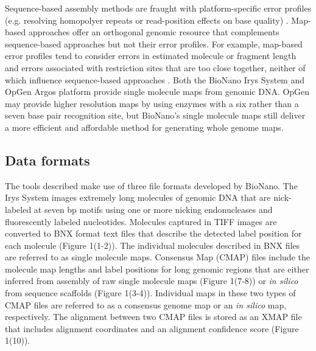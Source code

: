\documentclass{bmcart}
\begin{document}
Sequence-based assembly methods are fraught with platform-specific error profiles (e.g. resolving homopolyer repeats or read-position effects on base quality) \cite{SeqBias2013}. Map-based approaches offer an orthogonal genomic resource that complements sequence-based approaches but not their error profiles. For example, map-based error profiles tend to consider errors in estimated molecule or fragment length and errors associated with restriction sites that are too close together, neither of which influence sequence-based approaches \cite{OpGenAnalysis2014,BioNanoSV2014}. Both the BioNano Irys System and OpGen Argos platform provide single molecule maps from genomic DNA. OpGen may provide higher resolution maps by using enzymes with a six rather than a seven base pair recognition site, but BioNano's single molecule maps still deliver a more efficient and affordable method for generating whole genome maps.  


\subsection*{Data formats}
The tools described make use of three file formats developed by BioNano. The Irys System images extremely long molecules of genomic DNA that are nick-labeled at seven bp motifs using one or more nicking endonucleases and fluorescently labeled nucleotides. Molecules captured in TIFF images are converted to BNX format text files that describe the detected label position for each molecule (Figure 1(1-2)). The individual molecules described in BNX files are referred to as single molecule maps. Consensus Map (CMAP) files include the molecule map lengths and label positions for long genomic regions that are either inferred from assembly of raw single molecule maps (Figure 1(7-8)) or \textit{in silico} from sequence scaffolds (Figure 1(3-4)). Individual maps in these two types of CMAP files are referred to as a consensus genome map or an \textit{in silico} map, respectively. The alignment between two CMAP files is stored as an XMAP file that includes alignment coordinates and an alignment confidence score (Figure 1(10)).
\end{document}
